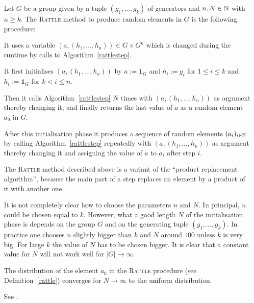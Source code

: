 \begin{Def}
    \label{rattle}
Let $G$ be a group given by a tuple $(g_1, \ldots, g_k)$ of generators
and $n, N \in \mathbb{N}$ with $n \ge k$. The \textsc{Rattle} method to
produce random elements in $G$ is the following procedure:

It uses a variable $(a,(h_1,\ldots,h_n)) \in G \times G^n$
which is changed during the runtime by calls to
Algorithm~\ref{rattlestep}.

It first initialises $(a,(h_1,\ldots,h_n))$
by $a := \mathbf{1}_G$ and $h_i := g_i$ for $1 \le i \le k$ and $h_i
:= \mathbf{1}_G$ for $k < i \le n$.

Then it calls Algorithm~\ref{rattlestep} $N$
times with $(a,(h_1, \ldots, h_n))$ as argument
thereby changing it, and
finally returns the last value of $a$ as a random element $a_0$ in $G$.

After this initialisation phase it produces a sequence of random
elements $(a_i)_{i \in \mathbb{N}}$ by calling 
Algorithm~\ref{rattlestep} repeatedly with 
$(a,(h_1, \ldots, h_n))$ as argument thereby changing it and
assigning the value of $a$ to $a_i$ after step $i$.
\end{Def}

\begin{Rem}
The \textsc{Rattle} method described above is a variant of the
``product replacement algorithm'', because the main part of a step replaces 
an element by a product of it with another one.
\end{Rem}

\begin{Rem}
It is not completely clear how to choose the parameters $n$ and $N$. In
principal, $n$ could be chosen equal to $k$. However, what a good length
$N$ of the initialisation phase is depends on the group $G$ and
on the generating tuple $(g_1, \ldots, g_k)$. In practice one chooses $n$
slightly bigger than $k$ and $N$ around $100$ unless $k$ is very big.
For large $k$ the value of $N$ has to be chosen bigger. It is clear
that a constant value for $N$ will not work well for $|G| \to \infty$.
\end{Rem}

\begin{Prop}
    \label{proprattle}
    The distribution of the element $a_0$ in the \textsc{Rattle} procedure (see
    Definition~\ref{rattle}) converges for $N \to \infty$ to the
    uniform distribution.
\end{Prop}
\proofbeg
See \cite[Section~4]{LGMurray}.
\proofend


